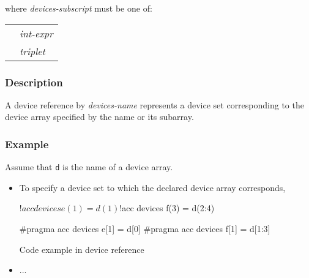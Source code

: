 \vspace{1em}
where {\it devices-subscript} must be one of:
\vspace{1em}

\begin{tabular}{ll}
 \hspace{0.5cm} & {\it int-expr} \\
                & {\it triplet}
\end{tabular}

\subsubsection*{Description}
A device reference by {\it devices-name} represents a device set corresponding to the device array specified by the name or its subarray.

\subsubsection*{Example}
Assume that {\tt d} is the name of a device array.
\begin{itemize}
\item To specify a device set to which the declared device array corresponds,\\

\begin{myfigure}
\begin{minipage}{0.40\hsize}
\begin{center}
\begin{XACCFexampleL}
!$acc devices e(1) = d(1)
!$acc devices f(3) = d(2:4)
\end{XACCFexampleL}
\end{center}
\end{minipage}
%
\begin{minipage}{0.45\hsize}
\begin{center}
\begin{XACCCexampleR}
#pragma acc devices e[1] = d[0]
#pragma acc devices f[1] = d[1:3]
\end{XACCCexampleR}
\end{center}
\end{minipage}
\caption{Code example in {\XACC} device reference}\label{code:device_ref}
\end{myfigure}

\item ...

\end{itemize}




